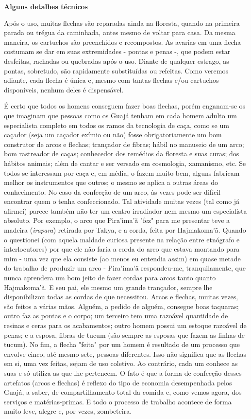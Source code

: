 \textbf{Alguns detalhes técnicos}

Após o uso, muitas flechas são reparadas ainda na floresta, quando na
primeira parada ou trégua da caminhada, antes mesmo de voltar para casa.
Da mesma maneira, os cartuchos são preenchidos e recompostos. As avarias
em uma flecha costumam se dar em suas extremidades - pontas e penas -,
que podem estar desfeitas, rachadas ou quebradas após o uso. Diante de
qualquer estrago, as pontas, sobretudo, são rapidamente substituídas ou
refeitas. Como veremos adiante, cada flecha é única e, mesmo com tantas
flechas e/ou cartuchos disponíveis, nenhum deles é dispensável.

É certo que todos os homens conseguem fazer boas flechas, porém
enganam-se os que imaginam que pessoas como os Guajá tenham em cada
homem adulto um especialista completo em todos os ramos da tecnologia de
caça, como se um caçador (seja um caçador exímio ou não) fosse
obrigatoriamente um bom construtor de arcos e flechas; trançador de
fibras; hábil no manuseio de um arco; bom rastreador de caças;
conhecedor dos remédios da floresta e suas curas; dos hábitos animais;
além de cantar e ser versado em cosmologia, xamanismo, etc. Se todos se
interessam por caça e, em média, o fazem muito bem, alguns fabricam
melhor os instrumentos que outros; o mesmo se aplica a outras áreas do
conhecimento. No caso da confecção de um arco, às vezes pode ser difícil
encontrar quem o tenha confeccionado. Tal atividade muitas vezes (tal
como já afirmei) parece também não ter um centro irradiador nem mesmo um
especialista absoluto. Por exemplo, o arco que Pira'ima'ã "fez" para me
presentar teve a madeira (\emph{irapara}) retirada por Takya, e a corda,
feita por Hajmakoma'ã. Quando o questionei (com aquela maldade curiosa
presente na relação entre etnógrafo e interlocutores) por que ele não
faria a corda do arco que estava montando para mim - uma vez que ela
consiste (ao menos eu entendia assim) em quase metade do trabalho de
produzir um arco - Pira'ima'ã respondeu-me, tranquilamente, que nunca
aprendera um bom jeito de fazer cordas para arcos tanto quanto
Hajmakoma'ã. E seu pai, ele mesmo um grande trançador, sempre lhe
disponibilizou todas as cordas de que necessitou. Arcos e flechas,
muitas vezes, são feitos a várias mãos. Alguém, a pedido de alguém,
consegue boas taquaras; outro faz as pontas e o corpo; um terceiro tem
uma razoável quantidade de resinas e ceras para os acabamentos; outro
homem possui um estoque razoável de penas; e a esposa, fibras de tucum
(são sempre as esposas que fazem as linhas de tucum). No fim, a flecha
"feita" por um homem é resultado de um processo que envolve cinco, até
mesmo sete, pessoas diferentes. Isso não significa que as flechas em si,
uma vez feitas, sejam de uso coletivo. Ao contrário, cada um conhece as
suas e só utiliza as que lhe pertencem. O fato é que a forma de
confecção desses artefatos (arcos e flechas) é reflexo do tipo de
economia desempenhada pelos Guajá, a saber, de compartilhamento total da
comida e, como vemos agora, dos serviços e matérias-primas. E todo o
processo de trabalho acontece de forma muito leve, alegre e, por vezes,
zombeteira.

